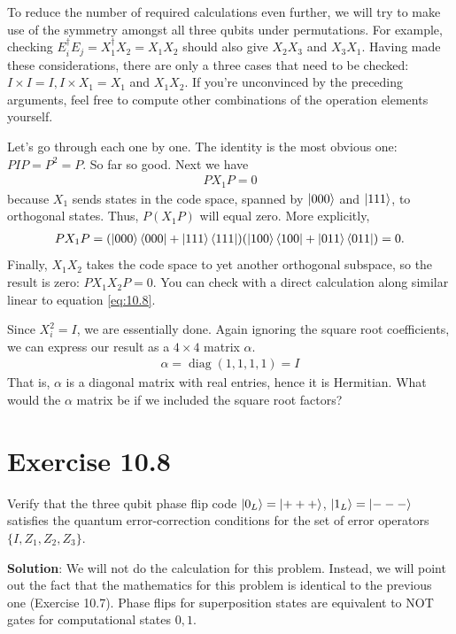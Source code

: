 \documentclass{book}
\DeclareMathOperator{\diag}{diag}
\begin{document}
    To reduce the number of required calculations even further, we will try to make use of the symmetry amongst all three qubits under permutations. For example, checking $E_i^\dagger E_j = X_1^\dagger X_2 = X_1 X_2$ should also give $X_2 X_3$ and $X_3 X_1$. Having made these considerations, there are only a three cases that need to be checked: $I\times I = I, I\times X_1 = X_1$ and $X_1 X_2$. If you're unconvinced by the preceding arguments, feel free to compute other combinations of the operation elements yourself. 
    
    Let's go through each one by one. The identity is the most obvious one: $P I P = P^2 = P$. So far so good. Next we have
    \begin{align}
        P X_1 P = 0
    \end{align}
    because $X_1$ sends states in the code space, spanned by $\ket{000}$ and $\ket{111}$, to orthogonal states. Thus, $P (X_1 P)$ will equal zero. More explicitly,
    \begin{align} \label{eq:10.8}
        P X_1 P = (\ket{000}\bra{000} + \ket{111}\bra{111})(\ket{100} \bra{100}+ \ket{011}\bra{011}) = 0.
    \end{align}
    Finally, $X_1 X_2$ takes the code space to yet another orthogonal subspace, so the result is zero: $P X_1 X_2 P = 0$. You can check with a direct calculation along similar linear to equation \eqref{eq:10.8}.

    Since $X_i^2 = I$, we are essentially done. Again ignoring the square root coefficients, we can express our result as a $4\times4$ matrix $\alpha$.
    \begin{align}
        \alpha = \diag (1, 1, 1, 1) = I
    \end{align}
    That is, $\alpha$ is a diagonal matrix with real entries, hence it is Hermitian. What would the $\alpha$ matrix be if we included the square root factors?

\section*{Exercise 10.8}
    Verify that the three qubit phase flip code $\ket{0_L} = \ket{+++}$, $\ket{1_L} = \ket{---}$ satisfies the quantum error-correction conditions for the set of error operators $\{I, Z_1, Z_2, Z_3\}$.

    \textbf{Solution}: We will not do the calculation for this problem. Instead, we will point out the fact that the mathematics for this problem is identical to the previous one (Exercise 10.7). Phase flips for superposition states are equivalent to NOT gates for computational states $0, 1$.
\end{document}
